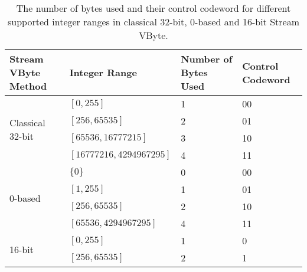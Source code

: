 \begin{table}
\centering
    \caption{\label{tab:groupsvb}The number of bytes used and their control codeword for different supported integer ranges in classical 32-bit, 0-based and 16-bit Stream VByte.}
    \begin{tabular}{|l|l|l|l|}%
        \hline
        Stream VByte Method & Integer Range & Number of Bytes Used & Control Codeword\\
        \hline
	    \multirow{4}{3cm}{Classical 32-bit} & $[0,255]$ & 1 & 00\\
	    &$[256,65535]$ & 2 & 01\\
	    &$[65536,16777215]$ & 3 & 10\\
	    &$[16777216,4294967295]$ & 4 & 11\\
        \hline
	    \multirow{4}{4em}{0-based} &$\{0\}$ & 0 & 00\\
	    &$[1,255]$ & 1 & 01\\
	    &$[256,65535]$ & 2 & 10\\
	    &$[65536,4294967295]$ & 4 & 11\\
        \hline
	    \multirow{2}{4em}{16-bit}    &$[0,255]$ & 1 & 0\\
	    &$[256,65535]$ & 2 & 1\\
        \hline
    \end{tabular}
\end{table}
